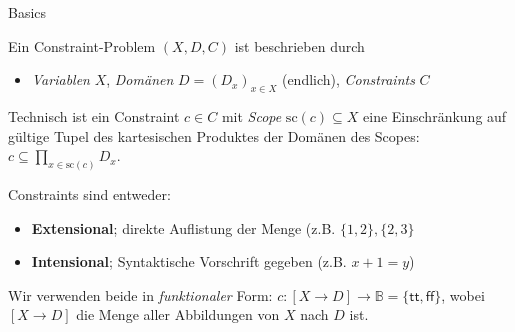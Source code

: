 \documentclass[10pt,xcolor={dvipsnames},fleqn]{beamer}
\begin{document}
\begin{frame}{Basics}
\begin{definition}
Ein \alert{Constraint-Problem} $(X, D, C)$ ist beschrieben durch
\begin{itemize}
  \item \emph{Variablen} $X$,
\emph{Domänen} $D = (D_x)_{x \in X}$ (endlich),
\emph{Constraints} $C$
\end{itemize} 
\end{definition}
\pause

\vspace*{2ex}

Technisch ist ein Constraint $c \in C$ mit \emph{Scope} $\mathrm{sc}(c) \subseteq X$ eine
Einschränkung auf gültige Tupel des kartesischen Produktes der Domänen des Scopes:
$c \subseteq \prod_{x \in \mathrm{sc}(c)} D_x$. \pause

\vspace*{2ex}

Constraints sind entweder:
\begin{itemize}
\item \textbf{Extensional}; direkte Auflistung der Menge (z.B. $\{1, 2\}, \{2, 3\}$
\item \textbf{Intensional}; Syntaktische Vorschrift gegeben (z.B. $x + 1 = y$)
\end{itemize} \pause 

Wir verwenden beide in \emph{funktionaler} Form: 
$c : [X \to D] \to \mathbb{B} = \{ \mathsf{tt}, \mathsf{ff} \}$, wobei $[X \to D]$ die Menge aller Abbildungen
von $X$ nach $D$ ist.
\end{frame} 
%
%
%
%
%
\end{document}
